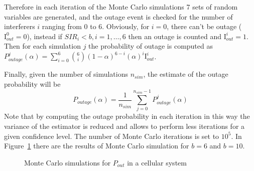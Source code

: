 \documentclass[10pt]{article}
\begin{document}
Therefore in each iteration of the Monte Carlo simulations 7 sets of random variables are generated, and the outage event is checked for the number of interferers $i$ ranging from 0 to 6. Obviously, for $i = 0$, there can't be outage ($\mathrm{I}_{out}^0 = 0$), instead if $SIR_i < b, i = 1, \dots, 6$ then an outage is counted and $\mathrm{I}_{out}^i = 1$. Then for each simulation $j$ the probability of outage is computed as $P_{outage}^j(\alpha) = \sum_{i = 0}^{6} \binom{6}{i} (1 - \alpha)^{6-i}(\alpha)^i \mathrm{I}_{out}^i$. 

Finally, given the number of simulations $n_{sim}$, the estimate of the outage probability will be
\begin{equation}
  P_{outage}(\alpha) = \frac{1}{n_{sim}} \sum_{j = 0}^{n_{sim} - 1} P_{outage}^j(\alpha)
\end{equation}
Note that by computing the outage probability in each iteration in this way the variance of the estimator is reduced and allows to perform less iterations for a given confidence level. The number of Monte Carlo iterations is set to $10^5$. In Figure~\ref{fig:cell_monte} there are the results of Monte Carlo simulation for $b = 6$ and $b = 10$.

\begin{figure}[h!]
  \centering
  \caption{Monte Carlo simulations for $P_{out}$ in a cellular system}
  \label{fig:cell_monte}
\end{figure}
\end{document}
